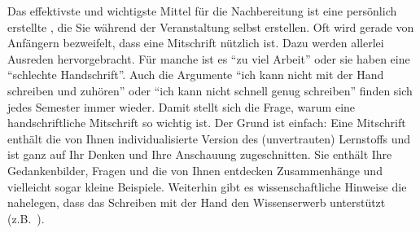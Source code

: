 Das effektivste und wichtigste Mittel für die Nachbereitung ist eine persönlich erstellte 
, die Sie während der Veranstaltung selbst erstellen. Oft wird gerade von Anfängern 
bezweifelt, dass eine  Mitschrift nützlich ist. Dazu werden allerlei Ausreden hervorgebracht. Für manche 
ist es "`zu viel  Arbeit"' oder sie haben eine "`schlechte Handschrift"'. Auch die Argumente "`ich kann 
nicht  mit der Hand schreiben und zuhören"' oder "`ich kann nicht schnell genug schreiben"' finden 
sich  jedes Semester immer wieder. Damit stellt sich die Frage, warum eine handschriftliche  Mitschrift 
so  wichtig ist. Der Grund ist einfach: Eine Mitschrift enthält die von Ihnen individualisierte Version 
des  (unvertrauten) Lernstoffs und ist  ganz auf Ihr Denken und Ihre Anschauung zugeschnitten. Sie 
enthält Ihre Gedankenbilder, Fragen und die von Ihnen entdecken Zusammenhänge und vielleicht 
sogar kleine Beispiele. Weiterhin gibt es wissenschaftliche Hinweise die nahelegen, dass das Schreiben 
mit der Hand den Wissenserwerb unterstützt (z.B.~\cite{MuBe14}). 

